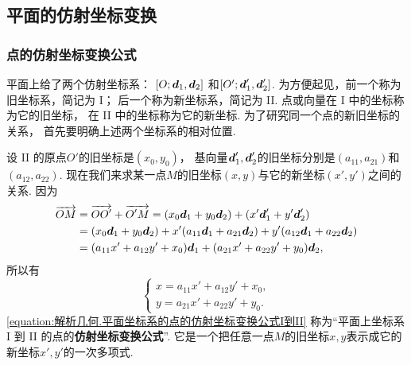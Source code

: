 \subsection{平面的仿射坐标变换}
\subsubsection{点的仿射坐标变换公式}
平面上给了两个仿射坐标系：
\([O;\boldsymbol{d}_1,\boldsymbol{d}_2]\)
和\([O';\boldsymbol{d}_1',\boldsymbol{d}_2']\).
为方便起见，前一个称为旧坐标系，简记为 I；
后一个称为新坐标系，简记为 II.
点或向量在 I 中的坐标称为它的旧坐标，
在 II 中的坐标称为它的新坐标.
为了研究同一个点的新旧坐标的关系，
首先要明确上述两个坐标系的相对位置.

设 II 的原点\(O'\)的旧坐标是\((x_0,y_0)\)，
基向量\(\boldsymbol{d}_1',\boldsymbol{d}_2'\)的旧坐标分别是\((a_{11},a_{21})\)和\((a_{12},a_{22})\).
现在我们来求某一点\(M\)的旧坐标\((x,y)\)与它的新坐标\((x',y')\)之间的关系.
因为\begin{align*}
	\overrightarrow{OM}
	&= \overrightarrow{O O'} + \overrightarrow{O' M}
	= (x_0 \boldsymbol{d}_1 + y_0 \boldsymbol{d}_2)
	+ (x' \boldsymbol{d}_1' + y' \boldsymbol{d}_2') \\
	&= (x_0 \boldsymbol{d}_1 + y_0 \boldsymbol{d}_2)
	+ x' (a_{11} \boldsymbol{d}_1 + a_{21} \boldsymbol{d}_2)
	+ y' (a_{12} \boldsymbol{d}_1 + a_{22} \boldsymbol{d}_2) \\
	&= (a_{11} x' + a_{12} y' + x_0) \boldsymbol{d}_1
	+ (a_{21} x' + a_{22} y' + y_0) \boldsymbol{d}_2,
\end{align*}
所以有\begin{equation}\label{equation:解析几何.平面坐标系的点的仿射坐标变换公式I到II}
	\left\{ \begin{array}{l}
		x = a_{11} x' + a_{12} y' + x_0, \\
		y = a_{21} x' + a_{22} y' + y_0.
	\end{array} \right.
\end{equation}
\cref{equation:解析几何.平面坐标系的点的仿射坐标变换公式I到II}
称为“平面上坐标系 I 到 II 的点的\textbf{仿射坐标变换公式}”.
它是一个把任意一点\(M\)的旧坐标\(x,y\)表示成它的新坐标\(x',y'\)的一次多项式.


